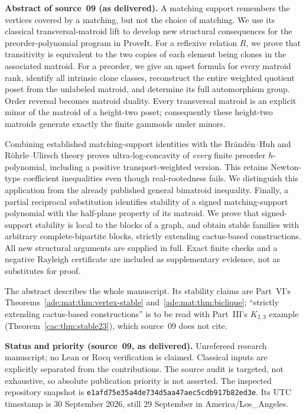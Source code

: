 \documentclass[11pt]{article}
\numberwithin{equation}{section}
\theoremstyle{definition}
\begin{document}
\begin{tcolorbox}[colback=white,colframe=Pale,arc=1mm]
\small\textbf{Abstract of source~09 (as delivered).}
A matching support remembers the vertices covered by a matching, but not the
choice of matching. We use its classical transversal-matroid lift to develop
new structural consequences for the preorder-polynomial program in
ProveIt. For a reflexive relation $R$, we prove that transitivity is equivalent
to the two copies of each element being clones in the associated matroid.
For a preorder, we give an upset formula for every matroid rank, identify all
intrinsic clone classes, reconstruct the entire weighted quotient poset from
the unlabeled matroid, and determine its full automorphism group. Order
reversal becomes matroid duality. Every transversal matroid is an explicit
minor of the matroid of a height-two poset; consequently these height-two
matroids generate exactly the finite gammoids under minors.

Combining established matching-support identities with the
Br\"and\'en--Huh and R\"ohrle--Ulirsch theory proves ultra-log-concavity of
\emph{every} finite preorder $h$-polynomial, including a positive
transport-weighted version. This retains Newton-type coefficient
inequalities even though real-rootedness fails. We distinguish this
application from the already published general bimatroid inequality.
Finally, a partial reciprocal substitution identifies stability of a signed
matching-support polynomial with the half-plane property of its matroid.
We prove that signed-support stability is local to the blocks of a graph,
and obtain stable families with arbitrary complete-bipartite blocks,
strictly extending cactus-based constructions. All new structural arguments
are supplied in full. Exact finite checks and a negative Rayleigh
certificate are included as supplementary evidence, not as substitutes for
proof.
\end{tcolorbox}
\noindent The abstract describes the whole manuscript. Its stability claims
are Part~VI's Theorems~\ref{ade:mat:thm:vertex-stable}
and~\ref{ade:mat:thm:biclique}; ``strictly extending cactus-based
constructions'' is to be read with Part~III's $K_{2,3}$ example
(Theorem~\ref{cac:thm:stable23}), which source~09 does not cite.

\begin{statusbox}
\small\textbf{Status and priority (source~09, as delivered).}
Unrefereed research manuscript; no Lean or Rocq
verification is claimed. Classical inputs are explicitly separated from the
contributions. The source audit is targeted, not exhaustive, so absolute
publication priority is not asserted. The inspected repository snapshot is
\texttt{e1afd75e35a4de734d5aa47aec5cdb917b82ed3e}. Its UTC timestamp is 30 September 2026, still 29 September in
America/Los\_Angeles.
\end{statusbox}
\end{document}

